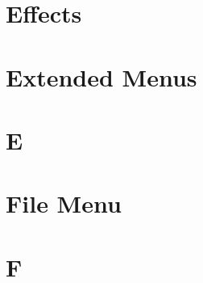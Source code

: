 \documentclass[openany]{book}
\begin{document}
\chapter{Effects}











\chapter{Extended Menus}






%







\chapter{E}











\chapter{File Menu}







\chapter{F}




\end{document}
